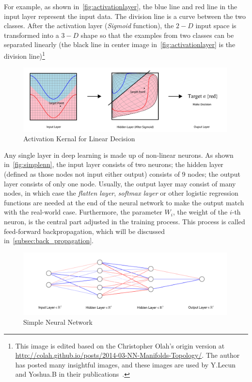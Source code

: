 \begin{spacing}{1.5}
For example, as shown in~\autoref{fig:activationlayer}, the blue line and red line in the input layer represent the input data. The division line is a curve between the two classes. After the activation layer (\textit{Sigmoid} function), the $2-D$ input space is transformed into a $3-D$ shape so that the examples from two classes can be separated linearly (the black line in center image in~\autoref{fig:activationlayer} is the division line)\footnote{This image is edited based on the Christopher Olah's origin version at  \url{http://colah.github.io/posts/2014-03-NN-Manifolds-Topology/}. The author has posted many insightful images, and these images are used by Y.Lecun and Yoshua.B in their publications~\cite{bengio2017deep, lecun2015deep}.}


\begin{figure}[th]
\centering
\includegraphics[width=0.99\textwidth, fbox]{Chapter2/activation.pdf}
\caption{Activation Kernal for Linear Decision~\cite{olah2014neural}}
\label{fig:activationlayer} 
\end{figure}

Any single layer in deep learning is made up of non-linear neurons. As shown in~\autoref{fig:simplenn}, the input layer consists of two neurons; the hidden layer (defined as those nodes not input either output) consists of 9 nodes; the output layer consists of only one node. Usually, the output layer may consist of many nodes, in which case the \textit{flatten layer}, \textit{softmax layer} or other logistic regression functions are needed at the end of the neural network to make the output match with the real-world case. Furthermore, the parameter $W_i$, the weight of the $i$-th neuron, is the central part adjusted in the training process. This process is called feed-forward backpropagation, which will be discussed in~\autoref{subsec:back_propagation}.

\begin{figure}[th]
\centering
\includegraphics[width=0.99\textwidth, fbox]{Chapter2/simplenn.pdf}
\caption{Simple Neural Network}
\label{fig:simplenn} 
\end{figure}


\end{spacing}
